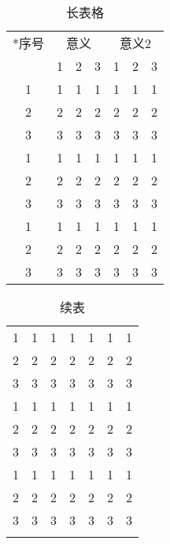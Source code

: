 \documentclass{WHUReport}
\begin{document}
\begin{multicols}{2}
\begin{table}[H]
\small
\centering
\caption{长表格}
\begin{tabular}{ccccccc}
\Xhline{1.0pt}
\multirow{2}*{序号} & \multicolumn{3}{c}{意义} & \multicolumn{3}{c}{意义2} \\ \cline{2-7} 
                    & 1      & 2      & 3     & 1      & 2      & 3     \\ \Xhline{0.5pt}
1                   & 1      & 1      & 1     & 1      & 1      & 1     \\
2                   & 2      & 2      & 2     & 2      & 2      & 2     \\
3                   & 3      & 3      & 3     & 3      & 3      & 3     \\
1                   & 1      & 1      & 1     & 1      & 1      & 1     \\
2                   & 2      & 2      & 2     & 2      & 2      & 2     \\
3                   & 3      & 3      & 3     & 3      & 3      & 3     \\
1                   & 1      & 1      & 1     & 1      & 1      & 1     \\
2                   & 2      & 2      & 2     & 2      & 2      & 2     \\
3                   & 3      & 3      & 3     & 3      & 3      & 3     \\
\end{tabular}
\end{table}
\begin{table}[H]
\small
\centering
\ContinuedFloat %
\caption{续表}
\begin{tabular}{ccccccc}
1                   & 1      & 1      & 1     & 1      & 1      & 1     \\
2                   & 2      & 2      & 2     & 2      & 2      & 2     \\
3                   & 3      & 3      & 3     & 3      & 3      & 3     \\
1                   & 1      & 1      & 1     & 1      & 1      & 1     \\
2                   & 2      & 2      & 2     & 2      & 2      & 2     \\
3                   & 3      & 3      & 3     & 3      & 3      & 3     \\
1                   & 1      & 1      & 1     & 1      & 1      & 1     \\
2                   & 2      & 2      & 2     & 2      & 2      & 2     \\
3                   & 3      & 3      & 3     & 3      & 3      & 3     \\\Xhline{1.0pt}
\end{tabular}
\end{table}


\end{multicols}
\end{document}
